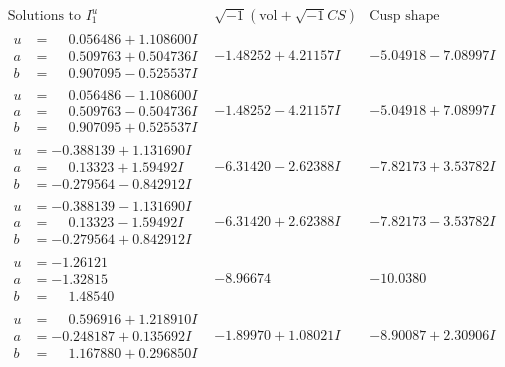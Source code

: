 \documentclass[1p]{elsarticle_modified}
\theoremstyle{definition}
\newcommand{\I}{\sqrt{-1}}
\begin{document}
$$\begin{array}{c|c|c}  
\text{Solutions to }I^u_{1}& \I (\text{vol} + \sqrt{-1}CS) & \text{Cusp shape}\\
 \hline 
\begin{aligned}
u &= \phantom{-}0.056486 + 1.108600 I \\
a &= \phantom{-}0.509763 + 0.504736 I \\
b &= \phantom{-}0.907095 - 0.525537 I\end{aligned}
 & -1.48252 + 4.21157 I & -5.04918 - 7.08997 I \\ \hline\begin{aligned}
u &= \phantom{-}0.056486 - 1.108600 I \\
a &= \phantom{-}0.509763 - 0.504736 I \\
b &= \phantom{-}0.907095 + 0.525537 I\end{aligned}
 & -1.48252 - 4.21157 I & -5.04918 + 7.08997 I \\ \hline\begin{aligned}
u &= -0.388139 + 1.131690 I \\
a &= \phantom{-}0.13323 + 1.59492 I \\
b &= -0.279564 - 0.842912 I\end{aligned}
 & -6.31420 - 2.62388 I & -7.82173 + 3.53782 I \\ \hline\begin{aligned}
u &= -0.388139 - 1.131690 I \\
a &= \phantom{-}0.13323 - 1.59492 I \\
b &= -0.279564 + 0.842912 I\end{aligned}
 & -6.31420 + 2.62388 I & -7.82173 - 3.53782 I \\ \hline\begin{aligned}
u &= -1.26121\phantom{ +0.000000I} \\
a &= -1.32815\phantom{ +0.000000I} \\
b &= \phantom{-}1.48540\phantom{ +0.000000I}\end{aligned}
 & -8.96674\phantom{ +0.000000I} & -10.0380\phantom{ +0.000000I} \\ \hline\begin{aligned}
u &= \phantom{-}0.596916 + 1.218910 I \\
a &= -0.248187 + 0.135692 I \\
b &= \phantom{-}1.167880 + 0.296850 I\end{aligned}
 & -1.89970 + 1.08021 I & -8.90087 + 2.30906 I \\ \hline\begin{aligned}

\end{aligned}
\end{array}$$
\end{document}
